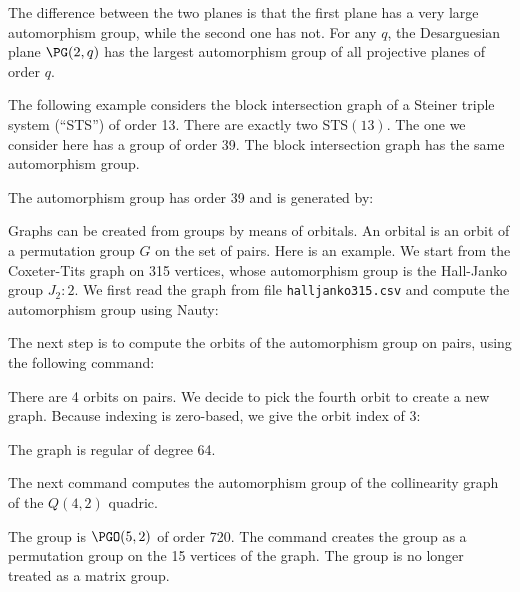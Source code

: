 The difference between the two planes is that the first plane 
has a very large automorphism group, while the second one has not. 
For any $q$, the Desarguesian plane $\PG(2,q)$ 
has the largest automorphism group 
of all projective planes of order $q$.




\bigskip


The following example considers the block intersection graph of 
a Steiner triple system (``STS'') of order 13. 
There are exactly two STS$(13)$. The one we consider here has a group of order 39. 
The block intersection graph has the same automorphism group.


The automorphism group has order 39 and is generated by:



\bigskip



Graphs can be created from groups by means of orbitals. An orbital is an orbit of a permutation 
group $G$ on the set of pairs. 
Here is an example. We start from the Coxeter-Tits graph on 315 vertices, whose automorphism group 
is the Hall-Janko group $J_2:2.$ 
We first read the graph from file \verb'halljanko315.csv' 
and compute the automorphism group using Nauty:


The next step is to compute the orbits of the automorphism group on pairs, using the following command:


There are 4 orbits on pairs. 
We decide to pick the fourth orbit to create a new graph. Because indexing is zero-based, 
we give the orbit index of 3:


The graph is regular of degree 64. 

\bigskip

The next command computes the automorphism group of the collinearity graph of the $Q(4,2)$ quadric.


The group is $\PGO(5,2)$ of order 720. 
The command creates the group as a permutation group on the 15 vertices of the graph. 
The group is no longer treated as a matrix group. 

 